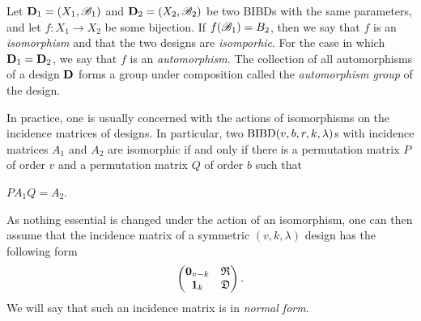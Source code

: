 \documentclass[../../../main]{subfiles}
\begin{document}
\begin{defin}\label{isomorphisms}
 Let $\mathbf{D}_1=(X_1,\mathscr{B}_1)$ and $\mathbf{D}_2=(X_2,\mathscr{B}_2)$ be two BIBDs with the same parameters, and let $f: X_1 \rightarrow X_2$ be some bijection. If $f(\mathscr{B}_1) = B_2$, then we say that $f$ is an {\it isomorphism} and that the two designs are {\it isomporhic}. For the case in which $\mathbf{D}_1 = \mathbf{D}_2$, we say that $f$ is an {\it automorphism}. The collection of all automorphisms of a design $\mathbf{D}$ forms a group under composition called the {\it automorphism group} of the design.

In practice, one is usually concerned with the actions of isomorphisms on the incidence matrices of designs. In particular, two $\text{BIBD}(v,b,r,k,\lambda)$s with incidence matrices $A_1$ and $A_2$ are isomorphic if and only if there is a permutation matrix $P$ of order $v$ and a permutation matrix $Q$ of order $b$ such that 
\begin{defenum}
\item\label{binary-equiv} $PA_1Q = A_2$.
\end{defenum}
\end{defin}

\begin{defin}
As nothing essential is changed under the action of an isomorphism, one can then
assume that the incidence matrix of a symmetric $(v,k,\lambda)$ design has the
following form  
\begin{equation}
    \begin{pmatrix}
     \mathbf{0}_{v-k} & \mathfrak{R} \\
     \mathbf{1}_k & \mathfrak{D}
    \end{pmatrix}.
\end{equation}
We will say that such an incidence matrix is in {\it normal form}.
\end{defin}

\biblio
\end{document}
